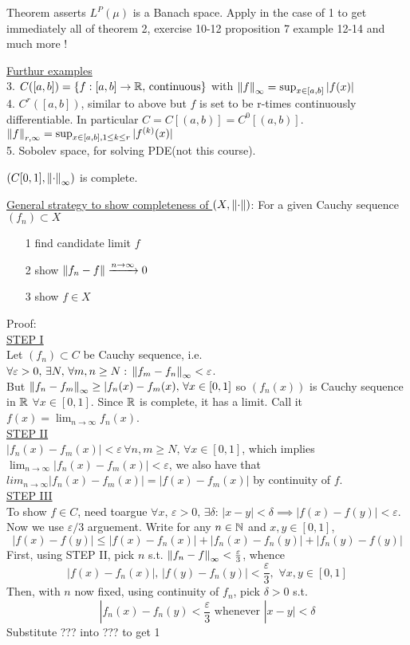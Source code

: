\documentclass{article}
\begin{document}
\begin{remark}
	Theorem asserts $L^P(\mu)$ is a Banach space. Apply in the case of 1 to get immediately all of theorem 2, exercise 10-12 proposition 7 example 12-14 and much more
	!

\end{remark}

\underline{Furthur examples}\\
3. $C([a,b])=\{f:[a,b]\to\mathbb{R},\,\text{continuous}\}$ with $\left\|{f}\right\|_\infty=\sup_{x\in[a,b]}|f(x)|$\\
4. $C^r([a,b])$, similar to above but $f$ is set to be r-times continuously differentiable. In particular $C=C[(a,b)]=C^0[(a,b)]$.  $\left\|{f}\right\|_{r,\infty}=\sup_{x\in[a,b],1\leq k\leq r}|f^{(k)}(x)|$\\
5. Sobolev space, for solving PDE(not this course).

\begin{proposition}
	$(C[0,1],\left\|{\cdot}\right\|_\infty)$ is complete.
\end{proposition}
\underline{General strategy to show completeness of  $(X,\left\|{\cdot}\right\|)$}: For a given Cauchy sequence $(f_n)\subset X$
\begin{itemize}
	\item [1] find candidate limit $f$
	\item [2] show $\left\|{f_n-f}\right\|\xrightarrow{n\to\infty}0$
	\item [3] show $f\in X$
\end{itemize}

Proof:\\
\underline{STEP I}\\
Let $(f_n)\subset C$ be Cauchy sequence, i.e. $\forall \varepsilon>0,\,\exists N,\,\forall m,n\geq N:\,\left\|{f_m-f_n}\right\|_\infty<\varepsilon$.\\
But $\left\|{f_n-f_m}\right\|_\infty\geq|f_n(x)-f_m(x),\,\forall x\in[0,1]$ so $\left(f_n(x)\right)$ is Cauchy sequence in $\mathbb{R}$ $\forall  x\in[0,1]$. Since $\mathbb{R}$ is complete, it has a limit. Call it $f(x)=\lim_{n\to\infty}f_n(x)$.\\
\underline{STEP II}\\
$|f_n(x)-f_m(x)|<\varepsilon\,\forall n,m\geq N,\,\forall x\in[0,1]$, which implies
$\lim_{n\to\infty}|f_n(x)-f_m(x)|<\varepsilon$, we also have that $lim_{n\to\infty}|f_n(x)-f_m(x)|=|f(x)-f_m(x)|$ by continuity of $f$.\\
\underline{STEP III}\\
To show $f\in C$, need toargue $\forall x,\,\varepsilon>0,\,\exists\delta:\,|x-y|<\delta\implies |f(x)-f(y)|<\varepsilon$. Now we use $\varepsilon/3$ arguement. Write for any $n\in\mathbb{N}$ and $x,y\in[0,1]$,
$$
	|f(x)-f(y)|\leq|f(x)-f_n(x)|+|f_n(x)-f_n(y)|+|f_n(y)-f(y)|
$$
First, using STEP II, pick $n$ s.t. $\left\|{f_n-f}\right\|_\infty<\frac{\varepsilon}{3}$, whence
$$
	|f(x)-f_n(x)|,\,|f(y)-f_n(y)|<\frac{\varepsilon}{3},\,\,\forall x,y\in[0,1]
$$
Then, with $n$ now fixed, using continuity of $f_n$, pick $\delta>0$ s.t.
$$
	|f_n(x)-f_n(y)<\frac{\varepsilon}{3}\text{ whenever } |x-y|<\delta$$
Substitute {\color{red}???} into ??? to get 1
\end{document}
